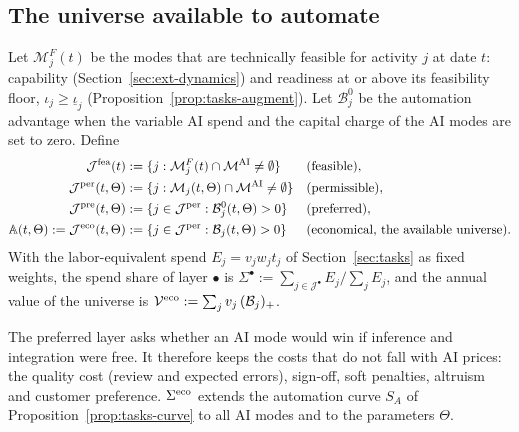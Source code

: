 \subsection{The universe available to automate}\label{sec:ext-universe}

\begin{definition}\label{def:ext-universe}
Let $\mathcal M^F_j(t)$ be the modes that are technically feasible for activity $j$ at date $t$: capability (Section~\ref{sec:ext-dynamics}) and readiness at or above its feasibility floor, $\iota_j\ge\underline\iota_j$ (Proposition~\ref{prop:tasks-augment}). Let $\mathcal B^0_j$ be the automation advantage when the variable AI spend and the capital charge of the AI modes are set to zero. Define
\begin{align*}
\mathcal J^{\rm fea}(t)&:=\{j:\mathcal M^F_j(t)\cap\mathcal M^{\rm AI}\neq\emptyset\}&&\text{(feasible)},\\
\mathcal J^{\rm per}(t,\Theta)&:=\{j:\mathcal M_j(t,\Theta)\cap\mathcal M^{\rm AI}\neq\emptyset\}&&\text{(permissible)},\\
\mathcal J^{\rm pre}(t,\Theta)&:=\{j\in\mathcal J^{\rm per}:\mathcal B^0_j(t,\Theta)>0\}&&\text{(preferred)},\\
\mathbb A(t,\Theta):=\mathcal J^{\rm eco}(t,\Theta)&:=\{j\in\mathcal J^{\rm per}:\mathcal B_j(t,\Theta)>0\}&&\text{(economical, the available universe).}
\end{align*}
With the labor-equivalent spend $E_j=v_jw_jt_j$ of Section~\ref{sec:tasks} as fixed weights, the spend share of layer $\bullet$ is $\Sigma^\bullet:=\sum_{j\in\mathcal J^\bullet}E_j/\sum_jE_j$, and the annual value of the universe is $\mathcal V^{\rm eco}:=\sum_jv_j\,(\mathcal B_j)_+$.
\end{definition}

The preferred layer asks whether an AI mode would win if inference and integration were free. It therefore keeps the costs that do not fall with AI prices: the quality cost (review and expected errors), sign-off, soft penalties, altruism and customer preference. $\Sigma^{\rm eco}$ extends the automation curve $S_A$ of Proposition~\ref{prop:tasks-curve} to all AI modes and to the parameters $\Theta$.

